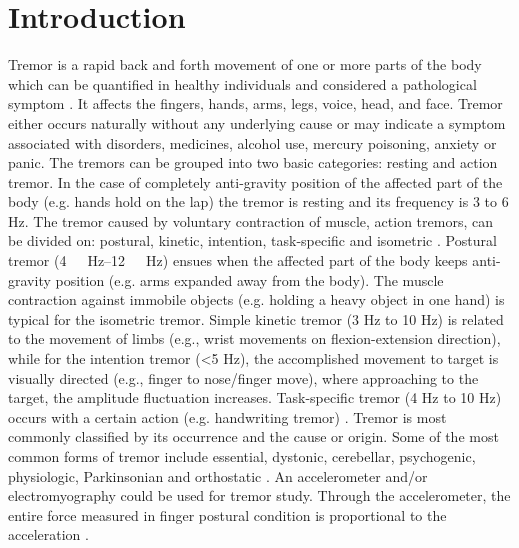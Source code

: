 \documentclass[conference, a4paper]{IEEEtran}
\begin{document}
\section{Introduction}
%
Tremor is a rapid back and forth movement of one or more parts of the body which can be quantified in healthy individuals and considered a pathological symptom \cite{RN8}. It affects the fingers, hands, arms, legs, voice, head, and face. Tremor either occurs naturally without any underlying cause or may indicate a symptom associated with disorders, medicines, alcohol use, mercury poisoning, anxiety or panic. The tremors can be grouped into two basic categories: resting and action tremor. In the case of completely anti-gravity position of the affected part of the body (e.g. hands hold on the lap) the tremor is resting and its frequency is 3 to 6 Hz. The tremor caused by voluntary contraction of muscle, action tremors, can be divided on: postural, kinetic, intention, task-specific and isometric \cite{RN7}. Postural tremor (\SIrange{4}{12}{\ Hz}) ensues when the affected part of the body keeps anti-gravity position (e.g. arms expanded away from the body). The muscle contraction against immobile objects (e.g. holding a heavy object in one hand) is typical for the isometric tremor. Simple kinetic tremor (3 Hz to 10 Hz) is related to the movement of limbs (e.g.,  wrist movements on flexion-extension direction), while for the intention tremor (<5 Hz),  the accomplished movement to target is visually directed (e.g., finger to nose/finger move), where approaching to the target, the amplitude fluctuation increases. Task-specific tremor (4 Hz to 10 Hz) occurs with a certain action (e.g. handwriting tremor) \cite{RN7}. Tremor is most commonly classified by its occurrence and the cause or origin.  Some of the most common forms of tremor include essential, dystonic, cerebellar, psychogenic, physiologic, Parkinsonian and orthostatic \cite{RN16,RN18}. An accelerometer and/or electromyography could be used for tremor study. Through the accelerometer, the entire force measured in finger postural condition  is proportional to the acceleration \cite{RN21}.
\end{document}

